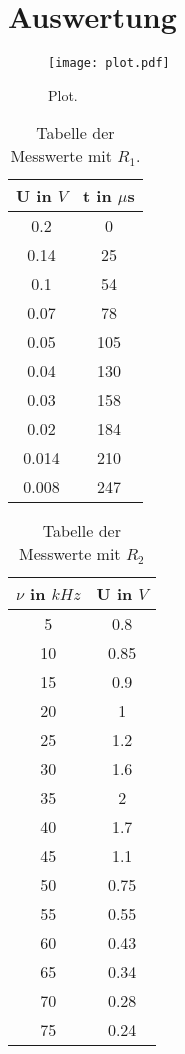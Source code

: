 \section{Auswertung}
\label{sec:Auswertung}

\begin{figure}
  \centering
  \texttt{[image: plot.pdf]}
  \caption{Plot.}
  \label{fig:plot}
\end{figure}

\begin{table}
  \centering
  \caption{Tabelle der Messwerte mit \(R_1\).}
  \label{tab:tab1}
  \begin{tabular}{c c}
    \toprule
    U in $V$ & t in $\mu$s\\
    \midrule
    0.2 & 0\\
    0.14 & 25\\
    0.1 & 54\\
    0.07 & 78\\
    0.05 & 105\\
    0.04 & 130\\
    0.03 & 158\\
    0.02 & 184\\
    0.014 & 210\\
    0.008 & 247\\
    \bottomrule
  \end{tabular}
\end{table}

\begin{table}
  \centering
  \caption{Tabelle der Messwerte mit \(R_2\)}
  \label{tab:tab2}
  \begin{tabular}{c c}
    \toprule
    $\nu$ in $kHz$ & U in $V$\\
    \midrule
    5 & 0.8\\
    10 & 0.85\\
    15 & 0.9\\
    20 & 1\\
    25 & 1.2\\
    30 & 1.6\\
    35 & 2\\
    40 & 1.7\\
    45 & 1.1\\
    50 & 0.75\\
    55 & 0.55\\
    60 & 0.43\\
    65 & 0.34\\
    70 & 0.28\\
    75 & 0.24\\
    \bottomrule
  \end{tabular}
\end{table}


